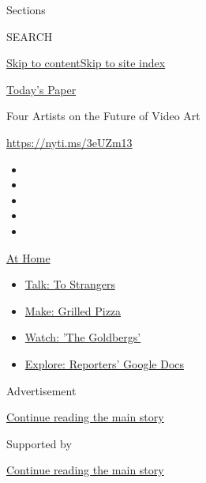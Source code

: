 Sections

SEARCH

\protect\hyperlink{site-content}{Skip to
content}\protect\hyperlink{site-index}{Skip to site index}

\href{https://myaccount.nytimes.com/auth/login?response_type=cookie\&client_id=vi}{}

\href{https://www.nytimes.com/section/todayspaper}{Today's Paper}

Four Artists on the Future of Video Art

\url{https://nyti.ms/3eUZm13}

\begin{itemize}
\item
\item
\item
\item
\item
\end{itemize}

\href{https://www.nytimes.com/spotlight/at-home?action=click\&pgtype=Article\&state=default\&region=TOP_BANNER\&context=at_home_menu}{At
Home}

\begin{itemize}
\tightlist
\item
  \href{https://www.nytimes.com/2020/08/03/well/family/the-benefits-of-talking-to-strangers.html?action=click\&pgtype=Article\&state=default\&region=TOP_BANNER\&context=at_home_menu}{Talk:
  To Strangers}
\item
  \href{https://www.nytimes.com/2020/08/01/at-home/coronavirus-make-pizza-on-a-grill.html?action=click\&pgtype=Article\&state=default\&region=TOP_BANNER\&context=at_home_menu}{Make:
  Grilled Pizza}
\item
  \href{https://www.nytimes.com/2020/07/31/arts/television/goldbergs-abc-stream.html?action=click\&pgtype=Article\&state=default\&region=TOP_BANNER\&context=at_home_menu}{Watch:
  'The Goldbergs'}
\item
  \href{https://www.nytimes.com/interactive/2020/at-home/even-more-reporters-editors-diaries-lists-recommendations.html?action=click\&pgtype=Article\&state=default\&region=TOP_BANNER\&context=at_home_menu}{Explore:
  Reporters' Google Docs}
\end{itemize}

Advertisement

\protect\hyperlink{after-top}{Continue reading the main story}

Supported by

\protect\hyperlink{after-sponsor}{Continue reading the main story}

